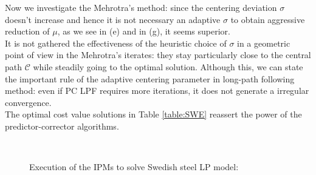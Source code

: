 \documentclass[a4paper,10 pt,titlepage,twoside]{book}
\theoremstyle{plain}
\theoremstyle{definition}
\theoremstyle{remark}
\begin{document}
{{Now we investigate the Mehrotra's method: since the centering deviation $\sigma$ doesn't increase and hence it is not necessary an adaptive $\sigma$ to obtain aggressive reduction of $\mu$, as we see in (e) and in (g), it seems superior.\\
It is not gathered the effectiveness of the heuristic choice of $\sigma$ in a geometric point of view in the Mehrotra's iterates: they stay particularly close to the central path $\mathcal{C}$ while steadily going to the optimal solution. 
Although this, we can state the important rule of the adaptive centering parameter in long-path following method: even if PC LPF requires more iterations, it does not generate a irregular convergence. \\The optimal cost value solutions in Table \ref{table:SWE} reassert the power of the predictor-corrector algorithms.   
\begin{figure}\caption{\label{figure:swe}Execution of the IPMs to solve Swedish steel LP model:}
	 \qquad%
	\\
	 \qquad%

\end{figure}}}
\end{document}
